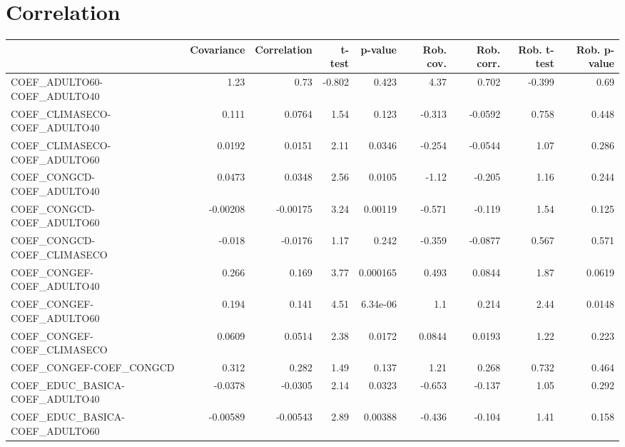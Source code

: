 \section{Correlation}
\begin{tabular}{lrrrrrrrr}
\toprule
{} &  Covariance &  Correlation &  t-test &  p-value &  Rob. cov. &  Rob. corr. &  Rob. t-test &  Rob. p-value \\
\midrule
COEF\_ADULTO60-COEF\_ADULTO40       &        1.23 &         0.73 &  -0.802 &    0.423 &       4.37 &       0.702 &       -0.399 &          0.69 \\
COEF\_CLIMASECO-COEF\_ADULTO40      &       0.111 &       0.0764 &    1.54 &    0.123 &     -0.313 &     -0.0592 &        0.758 &         0.448 \\
COEF\_CLIMASECO-COEF\_ADULTO60      &      0.0192 &       0.0151 &    2.11 &   0.0346 &     -0.254 &     -0.0544 &         1.07 &         0.286 \\
COEF\_CONGCD-COEF\_ADULTO40         &      0.0473 &       0.0348 &    2.56 &   0.0105 &      -1.12 &      -0.205 &         1.16 &         0.244 \\
COEF\_CONGCD-COEF\_ADULTO60         &    -0.00208 &     -0.00175 &    3.24 &  0.00119 &     -0.571 &      -0.119 &         1.54 &         0.125 \\
COEF\_CONGCD-COEF\_CLIMASECO        &      -0.018 &      -0.0176 &    1.17 &    0.242 &     -0.359 &     -0.0877 &        0.567 &         0.571 \\
COEF\_CONGEF-COEF\_ADULTO40         &       0.266 &        0.169 &    3.77 & 0.000165 &      0.493 &      0.0844 &         1.87 &        0.0619 \\
COEF\_CONGEF-COEF\_ADULTO60         &       0.194 &        0.141 &    4.51 & 6.34e-06 &        1.1 &       0.214 &         2.44 &        0.0148 \\
COEF\_CONGEF-COEF\_CLIMASECO        &      0.0609 &       0.0514 &    2.38 &   0.0172 &     0.0844 &      0.0193 &         1.22 &         0.223 \\
COEF\_CONGEF-COEF\_CONGCD           &       0.312 &        0.282 &    1.49 &    0.137 &       1.21 &       0.268 &        0.732 &         0.464 \\
COEF\_EDUC\_BASICA-COEF\_ADULTO40    &     -0.0378 &      -0.0305 &    2.14 &   0.0323 &     -0.653 &      -0.137 &         1.05 &         0.292 \\
COEF\_EDUC\_BASICA-COEF\_ADULTO60    &    -0.00589 &     -0.00543 &    2.89 &  0.00388 &     -0.436 &      -0.104 &         1.41 &         0.158 \\

\end{tabular}
